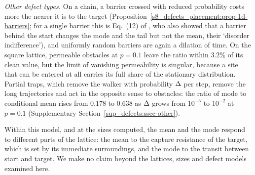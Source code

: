 \emph{Other defect types.} On a chain, a barrier crossed with reduced probability costs more the nearer it is to the target
(Proposition~\ref{s8_defects_placement:prop-1d-barriers}; for a single barrier this is Eq.~(12) of
\citet{SarvaharmanGiuggioli2023}, who also showed that a barrier behind the start changes the mode and the tail but not
the mean, their `disorder indifference'), and uniformly random barriers are again a dilation of time. On the
square lattice, permeable obstacles at $p=0.1$ leave the ratio within $3.2\%$ of its clean value, but the limit of vanishing
permeability is singular, because a site that can be entered at all carries its full share of the stationary distribution.
Partial traps, which remove the walker with probability $\Delta$ per step, remove the long trajectories and act in the
opposite sense to obstacles: the ratio of mode to conditional mean rises from $0.178$ to $0.638$ as $\Delta$ grows from $10^{-5}$
to $10^{-2}$ at $p=0.1$ (Supplementary Section~\ref{sup_defects:ssec-other}).

Within this model, and at the sizes computed, the mean and the mode respond to different parts of the lattice: the mean
to the capture resistance of the target, which is set by its immediate surroundings, and the mode to the transit between
start and target. We make no claim beyond the lattices, sizes and defect models examined here.
